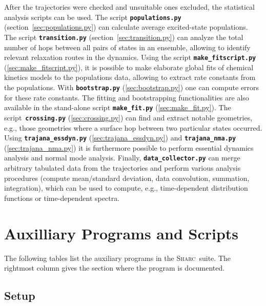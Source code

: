 \documentclass[a4paper,10pt,DIV=15,openany]{scrbook}
\newcommand{\sharc}{\textsc{Sharc}}
\newcommand{\ttt}[1]{\textbf{\texttt{#1}}}
\begin{document}
After the trajectories were checked and unsuitable ones excluded, the statistical analysis scripts can be used.
The script \ttt{populations.py} (section~\ref{sec:populations.py}) can calculate average excited-state populations. 
The script \ttt{transition.py} (section~\ref{sec:transition.py}) can analyze the total number of hops between all pairs of states in an ensemble, allowing to identify relevant relaxation routes in the dynamics.
Using the script \ttt{make\_fitscript.py} (\ref{sec:make_fitscript.py}), it is possible to make elaborate global fits of chemical kinetics models to the populations data, allowing to extract rate constants from the populations.
With \ttt{bootstrap.py} (\ref{sec:bootstrap.py}) one can compute errors for these rate constants.
The fitting and bootstrapping functionalities are also available in the stand-alone script \ttt{make\_fit.py} (\ref{sec:make_fit.py}).
The script~\ttt{crossing.py} (\ref{sec:crossing.py}) can find and extract notable geometries, e.g., those geometries where a surface hop between two particular states occurred.
Using \ttt{trajana\_essdyn.py} (\ref{sec:trajana_essdyn.py}) and \ttt{trajana\_nma.py} (\ref{sec:trajana_nma.py}) it is furthermore possible to perform essential dynamics analysis and normal mode analysis.
Finally, \ttt{data\_collector.py} can merge arbitrary tabulated data from the trajectories and perform various analysis procedures (compute mean/standard deviation, data convolution, summation, integration), which can be used to compute, e.g., time-dependent distribution functions or time-dependent spectra.


\section{Auxilliary Programs and Scripts}

The following tables list the auxiliary programs in the \sharc\ suite. The rightmost column gives the section where the program is documented.

\subsection{Setup}
\end{document}
